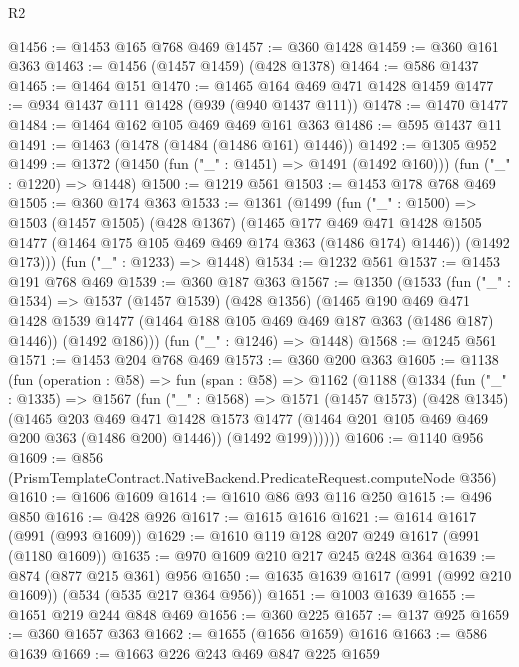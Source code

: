 \begin{lexlean}{R2}
\begin{coremodule}
@1456 := @1453 @165 @768 @469
@1457 := @360 @1428
@1459 := @360 @161 @363
@1463 := @1456 (@1457 @1459) (@428 @1378)
@1464 := @586 @1437
@1465 := @1464 @151
@1470 := @1465 @164 @469 @471 @1428 @1459
@1477 := @934 @1437 @111 @1428 (@939 (@940 @1437 @111))
@1478 := @1470 @1477
@1484 := @1464 @162 @105 @469 @469 @161 @363
@1486 := @595 @1437 @11
@1491 := @1463 (@1478 (@1484 (@1486 @161) @1446))
@1492 := @1305 @952
@1499 := @1372 (@1450 (fun ("_" : @1451) => @1491 (@1492 @160))) (fun ("_" : @1220) => @1448)
@1500 := @1219 @561
@1503 := @1453 @178 @768 @469
@1505 := @360 @174 @363
@1533 := @1361
    (@1499
      (fun ("_" : @1500) =>
      @1503
        (@1457 @1505)
        (@428 @1367)
        (@1465
          @177
          @469
          @471
          @1428
          @1505
          @1477
          (@1464 @175 @105 @469 @469 @174 @363 (@1486 @174) @1446))
        (@1492 @173)))
    (fun ("_" : @1233) => @1448)
@1534 := @1232 @561
@1537 := @1453 @191 @768 @469
@1539 := @360 @187 @363
@1567 := @1350
    (@1533
      (fun ("_" : @1534) =>
      @1537
        (@1457 @1539)
        (@428 @1356)
        (@1465
          @190
          @469
          @471
          @1428
          @1539
          @1477
          (@1464 @188 @105 @469 @469 @187 @363 (@1486 @187) @1446))
        (@1492 @186)))
    (fun ("_" : @1246) => @1448)
@1568 := @1245 @561
@1571 := @1453 @204 @768 @469
@1573 := @360 @200 @363
@1605 := @1138
    (fun (operation : @58) =>
    fun (span : @58) =>
    @1162
      (@1188
        (@1334
          (fun ("_" : @1335) =>
          @1567
            (fun ("_" : @1568) =>
            @1571
              (@1457 @1573)
              (@428 @1345)
              (@1465
                @203
                @469
                @471
                @1428
                @1573
                @1477
                (@1464 @201 @105 @469 @469 @200 @363 (@1486 @200) @1446))
              (@1492 @199))))))
@1606 := @1140 @956
@1609 := @856 (PrismTemplateContract.NativeBackend.PredicateRequest.computeNode @356)
@1610 := @1606 @1609
@1614 := @1610 @86 @93 @116 @250
@1615 := @496 @850
@1616 := @428 @926
@1617 := @1615 @1616
@1621 := @1614 @1617 (@991 (@993 @1609))
@1629 := @1610 @119 @128 @207 @249 @1617 (@991 (@1180 @1609))
@1635 := @970 @1609 @210 @217 @245 @248 @364
@1639 := @874 (@877 @215 @361) @956
@1650 := @1635 @1639 @1617 (@991 (@992 @210 @1609)) (@534 (@535 @217 @364 @956))
@1651 := @1003 @1639
@1655 := @1651 @219 @244 @848 @469
@1656 := @360 @225
@1657 := @137 @925
@1659 := @360 @1657 @363
@1662 := @1655 (@1656 @1659) @1616
@1663 := @586 @1639
@1669 := @1663 @226 @243 @469 @847 @225 @1659

\end{coremodule}
\end{lexlean}
